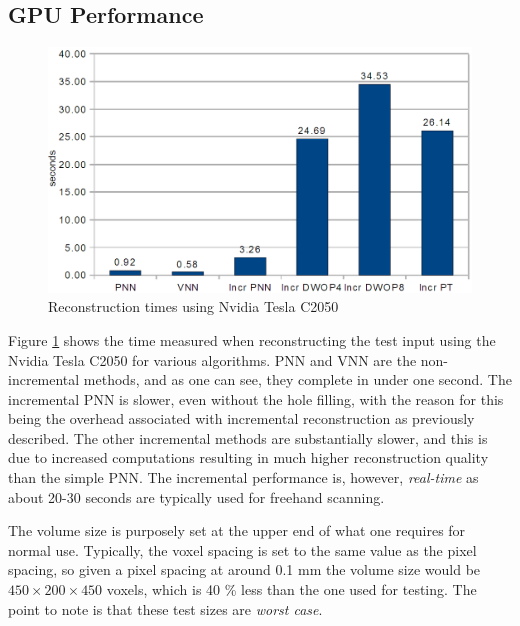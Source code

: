 \subsection{GPU Performance}

	\begin{figure}[h]
	\centering
	\includegraphics[width=\textwidth]{charts/gpu_performance.png}
	\caption{Reconstruction times using Nvidia Tesla C2050}
	\label{fig:gpu_performance}
	\end{figure}
	
	Figure \ref{fig:gpu_performance} shows the time measured when reconstructing the test input using the Nvidia Tesla C2050 for various algorithms. PNN and VNN are the non-incremental methods, and as one can see, they complete in under one second. The incremental PNN is slower, even without the hole filling, with the reason for this being the overhead associated with incremental reconstruction as previously described. The other incremental methods are substantially slower, and this is due to increased computations resulting in much higher reconstruction quality than the simple PNN. The incremental performance is, however, \emph{real-time} as about 20-30 seconds are typically used for freehand scanning.
	
	The volume size is purposely set at the upper end of what one requires for normal use. Typically, the voxel spacing is set to the same value as the pixel spacing, so given a pixel spacing at around 0.1 mm the volume size would be $450 \times 200 \times 450$ voxels, which is 40 \% less than the one used for testing. The point to note is that these test sizes are \emph{worst case}.
	
